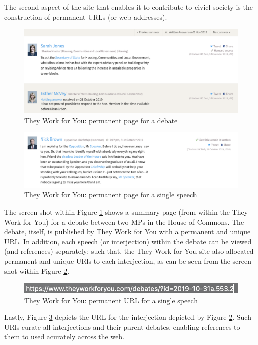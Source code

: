 The second aspect of the site that enables it to contribute to civicl society 
is the construction of permanent URLs (or web addresses).

\begin{figure}[h]
  \centering
  \includegraphics[scale=0.3]{images/they-work-for-you-implementation-permanent-urls-1}
  \caption{They Work for You: permanent page for a debate}
  \label{fig:/they-work-for-you-implementation-permanent-urls-1}
\end{figure}

\begin{figure}[h]
  \centering
  \includegraphics[scale=0.3]{images/they-work-for-you-implementation-permanent-urls-2}
  \caption{They Work for You: permanent page for a single speech}
  \label{fig:they-work-for-you-implementation-permanent-urls-2}
\end{figure}

The screen shot within Figure \ref{fig:/they-work-for-you-implementation-permanent-urls-1} shows a summary page (from within the They Work for You) for a debate between two MPs in the House of Commons. 
The debate, itself, is published by They Work for You with a permanent and unique URL.
In addition, each speech (or interjection) within the debate can be viewed (and references) separately; such that, the They Work for You site also allocated permanent and unique URls to each interjection, as can be seen from the screen shot within Figure \ref{fig:they-work-for-you-implementation-permanent-urls-2}.

\begin{figure}[h]
  \centering
  \includegraphics[scale=0.4]{images/they-work-for-you-implementation-permanent-urls-3}
  \caption{They Work for You: permanent URL for a single speech}
  \label{fig:they-work-for-you-implementation-permanent-urls-3}
\end{figure}

Lastly, Figure \ref{fig:they-work-for-you-implementation-permanent-urls-3} depicts the URL for the interjection depicted by Figure \ref{fig:they-work-for-you-implementation-permanent-urls-2}.
Such URls curate all interjections and their parent debates, enabling references to them to used acurately across the web.
